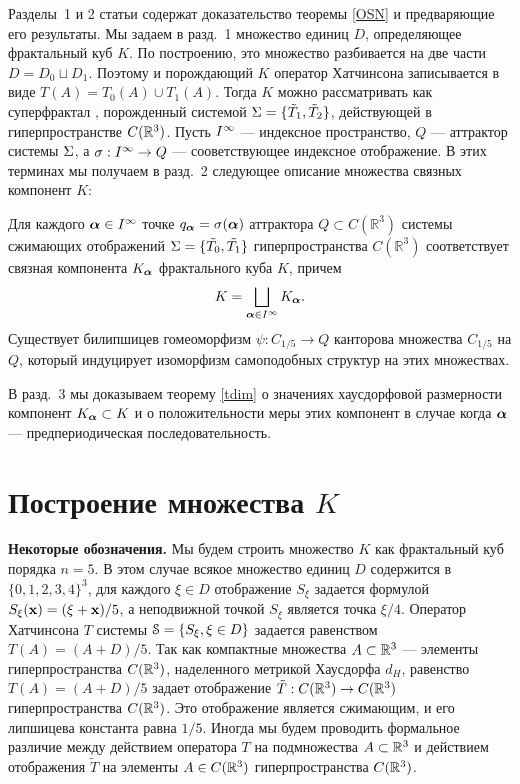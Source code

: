 Разделы~1 и 2 статьи содержат доказательство теоремы \ref{OSN} и предваряющие его результаты. 
Мы задаем в разд.~1 множество единиц $D$, определяющее  фрактальный куб  $K$. 
По построению, это множество  разбивается на две части $D= D_0\sqcup D_1$. Поэтому и порождающий $K$ оператор Хатчинсона записывается в виде $T(A)=T_0(A)\cup T_1(A)$.  
Тогда $K$ можно рассматривать как суперфрактал \cite[Definition 18]{SF}, порожденный системой $\Sigma=\{\tilde T_1, \tilde T_2\}$, действующей в гиперпространстве $C(\mathbb{R}^3)$. Пусть $I^\infty$ --- индексное пространство,    $Q$ --- аттрактор системы $\Sigma$, а $\sigma:I^\infty\to Q$ --- сооветствующее  индексное отображение. 
В этих терминах мы получаем в разд.~2 следующее описание множества связных компонент $K$:
\begin{theorem}\label{GGM}
Для каждого ${\bm{\alpha}}\in I^\infty$ точке  $q_{\bm{\alpha}}=\sigma({\bm{\alpha}})$ аттрактора $Q\subset C(\mathbb{R}^3)$ системы сжимающих отображений $\Sigma=\{\tilde{T_0},\tilde{T_1}\}$ гиперпространства $C(\mathbb{R}^3)$ соответствует  связная компонента $K_{\bm{\alpha}}$ фрактального куба $K$,  причем 
$$K=\bigsqcup\limits_{{\bm{\alpha}}\in I^\infty} K_{\bm{\alpha}}.$$ 
Существует билипшицев гомеоморфизм  $\psi: C_{1/5}\to Q$ канторова множества $C_{1/5}$ на $Q$, который индуцирует изоморфизм самоподобных структур на этих множествах.
\end{theorem}
В разд.~3 мы доказываем теорему \ref{tdim} о  значениях хаусдорфовой размерности компонент  $K_{\bm{\alpha}}\subset K$ и о положительности меры этих компонент  в случае когда ${\bm{\alpha}}$ --- предпериодическая последовательность.




\section{Построение множества $K$}

{\bf Некоторые обозначения.} Мы будем строить множество $K$ как фрактальный куб порядка $n=5$.
В этом случае всякое множество единиц $ D$ содержится в $\{0,1,2,3,4\}^3$, для каждого  $\xi\in D$ отображение $S_\xi$ задается  формулой  $S_\xi({\bf{x}})=(\xi+{\bf{x}})/5$, а неподвижной точкой $S_\xi$ является точка $\xi/4$.
Оператор Хатчинсона $T$ системы ${\EuScript S}=\{S_\xi, \xi\in D\}$ задается равенством $T(A)=(A+ D)/{5}$.
Так как компактные множества $A\subset\mathbb{R}^3$ --- элементы гиперпространства $C(\mathbb{R}^3)$, наделенного метрикой Хаусдорфа $d_H$, равенство $T(A)=(A+ D)/{5}$ задает  отображение ${\tilde T}:C(\mathbb{R}^3)\to C(\mathbb{R}^3)$ гиперпространства $C(\mathbb{R}^3)$. 
Это отображение является сжимающим, и его липшицева константа равна $1/5$.
Иногда мы будем проводить формальное различие между действием оператора $T$ на подмножества $A\subset \mathbb{R}^3$  и действием отображения $\tilde T$ на элементы $A\in C(\mathbb{R}^3)$ гиперпространства $C(\mathbb{R}^3)$.\smallskip


